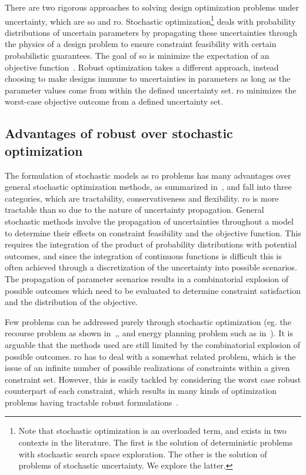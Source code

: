 There are two rigorous approaches to solving design optimization problems under uncertainty,
which are \gls{so} and \gls{ro}. Stochastic optimization\footnote{Note that stochastic
optimization is an overloaded term, and exists in two contexts in the literature. The first is the solution
of deterministic problems with stochastic search space exploration. The other is the solution
of problems of stochastic uncertainty. We explore the latter.}
deals with probability distributions of
uncertain parameters by propagating these uncertainties through the
physics of a design problem to ensure constraint feasibility with certain probabilistic guarantees.
The goal of \gls{so} is minimize the expectation of an objective function~\cite{Diwekar2008}.
Robust optimization takes a different approach, instead choosing to make designs immune to
uncertainties in parameters as long as the parameter values come from within the defined
uncertainty set. \gls{ro} minimizes the worst-case objective outcome from a defined uncertainty set.

\subsection{Advantages of robust over stochastic optimization}

The formulation of stochastic models as \gls{ro} problems has many advantages
over general stochastic optimization methods, as summarized in~\cite{Bertsimas2011},
and fall into three categories, which are tractability, conservativeness and flexibility.
\gls{ro} is more tractable than \gls{so} due to the nature of uncertainty propagation.
General stochastic methods involve the propagation of uncertainties throughout a model
to determine their effects on constraint feasibility and the objective function.
This requires the integration of the product of probability distributions with potential outcomes,
and since the integration of continuous functions is difficult this is often achieved through
a discretization of the uncertainty into possible scenarios. The propagation of parameter
scenarios results in a combinatorial explosion of possible outcomes which need to be evaluated to determine constraint
satisfaction and the distribution of the objective.

Few problems can be addressed purely through stochastic optimization (eg. the recourse problem as
shown in~\cite{Kall1982},\cite{Higle1991}, and energy planning problem such as in~\cite{Pereira1991}).
It is arguable that the methods used are still limited by the combinatorial
explosion of possible outcomes. \gls{ro} has to deal with a somewhat related problem, which is the issue of an infinite number
of possible realizations of constraints within a given constraint set. However, this is easily
tackled by considering the worst case robust counterpart of each constraint, which
results in many kinds of optimization problems having tractable robust formulations~\cite{Bertsimas2011}.

